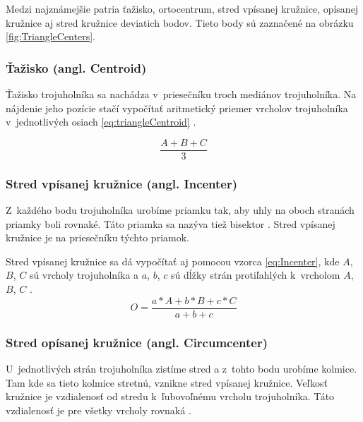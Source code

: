  Medzi najznámejšie patria ťažisko, ortocentrum, stred vpísanej kružnice, opísanej kružnice  aj stred kružnice deviatich bodov. Tieto body sú zaznačené na obrázku \ref{fig:TriangleCenters}.

\subsubsection{Ťažisko (angl. Centroid)}
Ťažisko trojuholníka sa nachádza v~priesečníku troch mediánov trojuholníka. Na nájdenie jeho pozície stačí vypočítať aritmetický priemer vrcholov trojuholníka v~jednotlivých osiach \ref{eq:triangleCentroid} \cite{Centroid_of_a_Triangle}.



\begin{equation}
    \frac{A+B+C}{3}
    \label{eq:triangleCentroid}
\end{equation}

\subsubsection{Stred vpísanej kružnice (angl. Incenter)}
\label{sec:TriangleCenter}

Z~každého bodu trojuholníka urobíme priamku tak, aby uhly na oboch stranách priam\-ky boli rovnaké. Táto priamka sa nazýva tiež bisektor \cite{angle_bisector_theorem}. Stred vpísanej kružnice je na priesečníku týchto priamok.




Stred vpísanej kružnice sa dá vypočítať aj pomocou vzorca \ref{eq:Incenter}, kde  $A$, $B$, $C$ sú vrcholy trojuholníka a $a$, $b$, $c$ sú dĺžky strán protiľahlých k~vrcholom $A$, $B$, $C$ \cite{Incenter_page_2011}.
\begin{equation}
O = \frac{a\ast A+b\ast  B +c \ast C}{a + b + c}
    \label{eq:Incenter}
\end{equation}


\subsubsection{Stred opísanej kružnice (angl. Circumcenter)}

U~jednotlivých strán trojuholníka zistíme stred a z~tohto bodu urobíme kolmice. Tam kde sa tieto kolmice stretnú, vznikne stred vpísanej kružnice. Veľkosť kružnice je vzdialenosť od stredu k~ľubovoľnému vrcholu trojuholníka. Táto vzdialenosť je pre všetky vrcholy rovnaká \cite{kelley2013humongous}.


